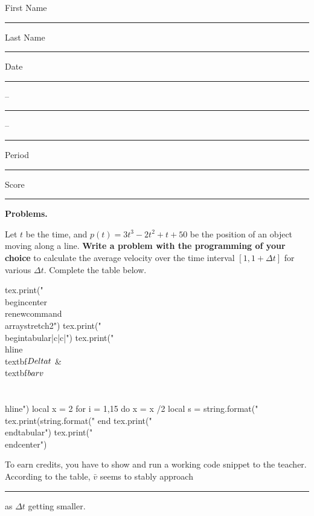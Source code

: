 \documentclass[twoside, 10pt]{article}
\title{}
\date{}
\begin{document}
\noindent
{\large
First Name \rule{6em}{.1pt}Last Name \rule{6em}{.1pt} Date \rule{1.5em}{.1pt} -- \rule{1.5em}{.1pt} -- \rule{1.5em}{.1pt} Period \rule{2em}{.1pt} Score \rule{2em}{.1pt}
}
\vspace{1em}
{\noindent\bf Problems.}

Let $t$ be the time, and $p(t) = 3t^3  - 2t^2+t +50$ be the position of an object moving along a line. {\bf Write a problem with the programming of your choice} to calculate the average velocity over the time interval $[1, 1+\Delta t]$ for various $\Delta t$. Complete the table below.
\vspace{1em}

\begin{luacode*}
tex.print("\\begin{center}\\renewcommand{\\arraystretch}{2}")
tex.print("\\begin{tabular}{|c|c|}")
tex.print("\\hline\\textbf{$\\Delta t$} & \\textbf{$\\bar{v}$} \\\\ \\hline")
local x = 2
for i = 1,15 do
  x = x /2
  local s = string.format("%
  tex.print(string.format("%
end
tex.print("\\end{tabular}")
tex.print("\\end{center}")
\end{luacode*}
\vspace{1em}
To earn credits, you have to show and run a working code snippet to the teacher.
According to the table, $\bar{v}$ seems to stably approach \rule{5em}{0.1pt} as $\Delta t$ getting smaller.
\end{document}
